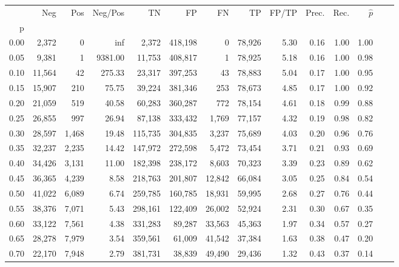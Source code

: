 \begin{tabular}{rrrrrrrrrrrrrr}
\toprule
{} &     Neg &    Pos &  Neg/Pos &       TN &       FP &      FN &      TP & FP/TP & Prec. &  Rec. & $\hat{p}$ \\
p    &         &        &          &          &          &         &         &       &       &       &           \\
\midrule
0.00 &   2,372 &      0 &      inf &    2,372 &  418,198 &       0 &  78,926 &  5.30 &  0.16 &  1.00 &      1.00 \\
0.05 &   9,381 &      1 &  9381.00 &   11,753 &  408,817 &       1 &  78,925 &  5.18 &  0.16 &  1.00 &      0.98 \\
0.10 &  11,564 &     42 &   275.33 &   23,317 &  397,253 &      43 &  78,883 &  5.04 &  0.17 &  1.00 &      0.95 \\
0.15 &  15,907 &    210 &    75.75 &   39,224 &  381,346 &     253 &  78,673 &  4.85 &  0.17 &  1.00 &      0.92 \\
0.20 &  21,059 &    519 &    40.58 &   60,283 &  360,287 &     772 &  78,154 &  4.61 &  0.18 &  0.99 &      0.88 \\
0.25 &  26,855 &    997 &    26.94 &   87,138 &  333,432 &   1,769 &  77,157 &  4.32 &  0.19 &  0.98 &      0.82 \\
0.30 &  28,597 &  1,468 &    19.48 &  115,735 &  304,835 &   3,237 &  75,689 &  4.03 &  0.20 &  0.96 &      0.76 \\
0.35 &  32,237 &  2,235 &    14.42 &  147,972 &  272,598 &   5,472 &  73,454 &  3.71 &  0.21 &  0.93 &      0.69 \\
0.40 &  34,426 &  3,131 &    11.00 &  182,398 &  238,172 &   8,603 &  70,323 &  3.39 &  0.23 &  0.89 &      0.62 \\
0.45 &  36,365 &  4,239 &     8.58 &  218,763 &  201,807 &  12,842 &  66,084 &  3.05 &  0.25 &  0.84 &      0.54 \\
0.50 &  41,022 &  6,089 &     6.74 &  259,785 &  160,785 &  18,931 &  59,995 &  2.68 &  0.27 &  0.76 &      0.44 \\
0.55 &  38,376 &  7,071 &     5.43 &  298,161 &  122,409 &  26,002 &  52,924 &  2.31 &  0.30 &  0.67 &      0.35 \\
0.60 &  33,122 &  7,561 &     4.38 &  331,283 &   89,287 &  33,563 &  45,363 &  1.97 &  0.34 &  0.57 &      0.27 \\
0.65 &  28,278 &  7,979 &     3.54 &  359,561 &   61,009 &  41,542 &  37,384 &  1.63 &  0.38 &  0.47 &      0.20 \\
0.70 &  22,170 &  7,948 &     2.79 &  381,731 &   38,839 &  49,490 &  29,436 &  1.32 &  0.43 &  0.37 &      0.14 \\

\end{tabular}
